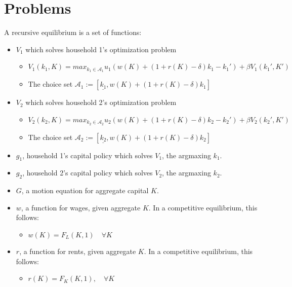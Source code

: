 \section{Problems}

\begin{questions}
\begin{solution}
A recursive equilibrium is a set of functions:
\begin{itemize}
	\item $V_1$ which solves household 1's optimization problem
		\begin{itemize}
			\item $V_1(k_1, K) = max_{k_1 \in \mathcal{A}_1} u_1\left(w\left(K\right) + \left(1+r\left(K\right) - \delta \right) k_1 - k_1'\right) + \beta V_1\left(k_1', K'\right)$
			\item The choice set $\mathcal{A}_1 := \left[ \underline{k_1}, w(K) + \left(1+r\left( K \right) - \delta \right) k_1 \right]$
		\end{itemize}
	\item $V_2$ which solves household 2's optimization problem
		\begin{itemize}
			\item $V_2(k_2, K) = max_{k_2 \in \mathcal{A}_2} u_2\left(w\left(K\right) + \left(1+r\left(K\right) - \delta \right) k_2 - k_2'\right) + \beta V_2\left(k_2', K'\right)$
			\item The choice set $\mathcal{A}_2 := \left[ \underline{k_2}, w(K) + \left(1+r\left( K \right) - \delta \right) k_2 \right]$
		\end{itemize}
	\item $g_1$, household 1's capital policy which solves $V_1$, the argmaxing $k_1$.
	\item $g_2$, household 2's capital policy which solves $V_2$, the argmaxing $k_2$.
	\item $G$, a motion equation for aggregate capital $K$.
	\item $w$, a function for wages, given aggregate $K$. In a competitive equilibrium, this follows: 
		\begin{itemize}
			\item $w(K) = F_L\left( K, 1\right) \quad \forall K$
		\end{itemize}
	\item $r$, a function for rents, given aggregate $K$. In a competitive equilibrium, this follows: 
		\begin{itemize}
			\item $r\left( K\right) = F_K\left(K, 1\right), \quad \forall K$
		\end{itemize}
\end{itemize}


\end{solution}
\end{questions}
